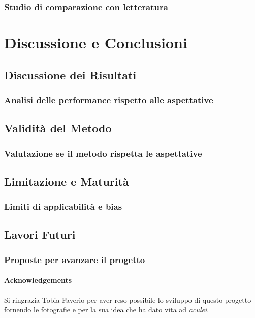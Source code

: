 \documentclass[12pt,a4paper,twoside]{article}
\begin{document}
\subsubsection{Studio di comparazione con letteratura}

\newpage
\section{Discussione e Conclusioni}

\subsection{Discussione dei Risultati}
\subsubsection{Analisi delle performance rispetto alle aspettative}

\subsection{Validità del Metodo}
\subsubsection{Valutazione se il metodo rispetta le aspettative}

\subsection{Limitazione e Maturità}
\subsubsection{Limiti di applicabilità e bias}

\subsection{Lavori Futuri}
\subsubsection{Proposte per avanzare il progetto}

\newpage
\paragraph{Acknowledgements} Si ringrazia Tobia Faverio per aver reso possibile lo sviluppo di 
questo progetto fornendo le fotografie e per la sua idea che ha dato vita ad \textit{aculei}.

\newpage
\printbibliography
\end{document}

